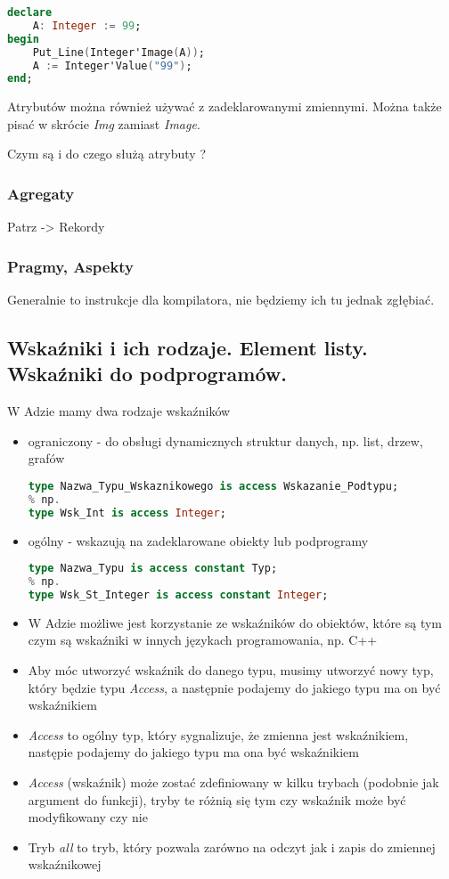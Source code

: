 \documentclass[a4paper,15pt]{article}
\newcommand{\ask}[2]{
    \begin{tcolorbox}[colback=black!5!white,colframe=gray,title={Pytanie #1}]
        #2
    \end{tcolorbox}
}
\begin{document}
\begin{lstlisting}[language=Ada, caption='Value i 'Image]
declare 
	A: Integer := 99;
begin
	Put_Line(Integer'Image(A));
	A := Integer'Value("99");
end;
\end{lstlisting}
Atrybutów można również używać z zadeklarowanymi zmiennymi. Można także pisać w skrócie \textit{Img} zamiast \textit{Image}.

\ask{}{
Czym są i do czego służą atrybuty ?
}

\subsubsection{Agregaty}
Patrz -> Rekordy

\subsubsection{Pragmy, Aspekty}
Generalnie to instrukcje dla kompilatora, nie będziemy ich tu jednak zgłębiać.

\subsection{Wskaźniki i ich rodzaje. Element listy. Wskaźniki do podprogramów.}

W Adzie mamy dwa rodzaje wskaźników
\begin{itemize}
\item ograniczony - do obsługi dynamicznych struktur danych, np. list, drzew, grafów
\begin{lstlisting}[language=Ada]
type Nazwa_Typu_Wskaznikowego is access Wskazanie_Podtypu;
% np.
type Wsk_Int is access Integer;
\end{lstlisting}
\item ogólny - wskazują na zadeklarowane obiekty lub podprogramy
\begin{lstlisting}[language=Ada]
type Nazwa_Typu is access constant Typ;
% np.
type Wsk_St_Integer is access constant Integer;
\end{lstlisting}
\end{itemize}

\begin{itemize}
\item W Adzie możliwe jest korzystanie ze wskaźników do obiektów, które są tym czym są wskaźniki w innych językach programowania, np. C++
\item Aby móc utworzyć wskaźnik do danego typu, musimy utworzyć nowy typ, który będzie typu \textit{Access}, a następnie podajemy do jakiego typu ma on być wskaźnikiem
\item \textit{Access} to ogólny typ, który sygnalizuje, że zmienna jest wskaźnikiem, następie podajemy do jakiego typu ma ona być wskaźnikiem
\item \textit{Access} (wskaźnik) może zostać zdefiniowany w kilku trybach (podobnie jak argument do funkcji), tryby te różnią się tym czy wskaźnik może być modyfikowany czy nie
\item Tryb \textit{all} to tryb, który pozwala zarówno na odczyt jak i zapis do zmiennej wskaźnikowej
\end{itemize} 
\end{document}
